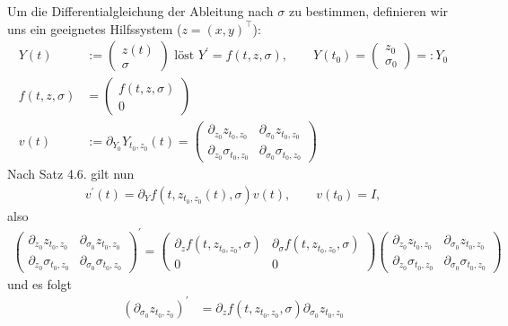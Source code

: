 \begin{solution}
\begin{enumerate}[label = \textbf{\alph*)}]
Um die Differentialgleichung der Ableitung nach $\sigma$ zu bestimmen,
definieren wir uns ein geeignetes Hilfssystem ($z = (x,y)^{\top}$):
\begin{align*}
  Y(t) &:= \begin{pmatrix}
    z(t) \\ \sigma
  \end{pmatrix} \text{ löst }
  Y^{\prime} = f(t,z,\sigma), \qquad Y(t_0) =
  \begin{pmatrix}
    z_0 \\ \sigma_0
  \end{pmatrix} =: Y_0 \\
    f(t,z,\sigma) &= \begin{pmatrix}
      f(t,z,\sigma) \\ 0
  \end{pmatrix} \\
  v(t) &:= \partial_{Y_0} Y_{t_0,z_0}(t) =
  \begin{pmatrix}
    \partial_{z_0} z_{t_0,z_0} & \partial_{\sigma_0} z_{t_0,z_0} \\
    \partial_{z_0} \sigma_{t_0,z_0} & \partial_{\sigma_0} \sigma_{t_0,z_0}
  \end{pmatrix}
\end{align*}
Nach Satz 4.6. gilt nun
\begin{align*}
  v^{\prime}(t) = \partial_Y f(t,z_{t_0,z_0}(t), \sigma)v(t), \qquad v(t_0) = I,
\end{align*}
also
\begin{align*}
\begin{pmatrix}
  \partial_{z_0} z_{t_0,z_0} & \partial_{\sigma_0} z_{t_0,z_0} \\
  \partial_{z_0} \sigma_{t_0,z_0} & \partial_{\sigma_0} \sigma_{t_0,z_0}
\end{pmatrix}^{\prime}
=
\begin{pmatrix}
  \partial_{z} f(t,z_{t_0,z_0}, \sigma) & \partial_{\sigma} f(t,z_{t_0,z_0}, \sigma) \\
  0 & 0
\end{pmatrix}
\begin{pmatrix}
  \partial_{z_0} z_{t_0,z_0} & \partial_{\sigma_0} z_{t_0,z_0} \\
  \partial_{z_0} \sigma_{t_0,z_0} & \partial_{\sigma_0} \sigma_{t_0,z_0}
\end{pmatrix}
\end{align*}
und es folgt
\begin{align*}
  (\partial_{\sigma_0} z_{t_0,z_0})^{\prime} &= \partial_z f(t,z_{t_0,z_0},\sigma) \partial_{\sigma_0} z_{t_0,z_0}

\end{align*}
\end{enumerate}
\end{solution}

